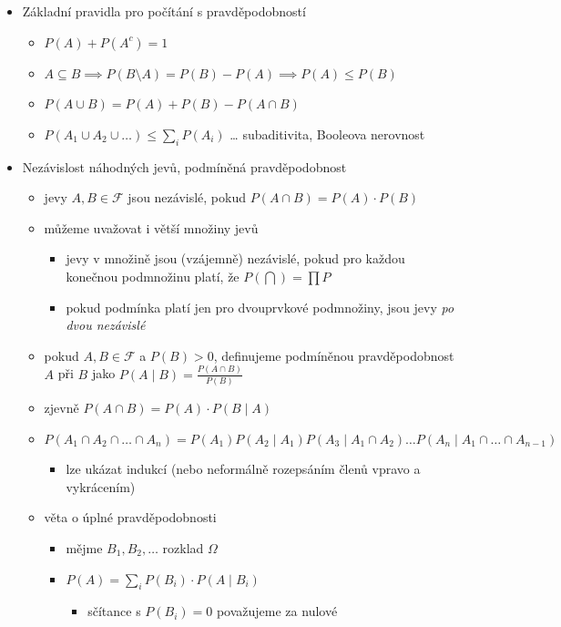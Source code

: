 \begin{itemize}
\item Základní pravidla pro počítání s pravděpodobností
\begin{itemize}
\item $P(A)+P(A^c)=1$
\item $A\subseteq B\implies P(B\setminus A)=P(B)-P(A)\implies P(A)\leq P(B)$
\item $P(A\cup B)=P(A)+P(B)-P(A\cap B)$
\item $P(A_1\cup A_2\cup\dots)\leq\sum_i P(A_i)$ \dots{} subaditivita, Booleova nerovnost
\end{itemize}
\item Nezávislost náhodných jevů, podmíněná pravděpodobnost
\begin{itemize}
\item jevy $A,B\in\mathcal F$ jsou nezávislé, pokud $P(A\cap B)=P(A)\cdot P(B)$
\item můžeme uvažovat i větší množiny jevů
\begin{itemize}
\item jevy v množině jsou (vzájemně) nezávislé, pokud pro každou konečnou podmnožinu platí, že $P(\bigcap)=\prod P$
\item pokud podmínka platí jen pro dvouprvkové podmnožiny, jsou jevy \textit{po dvou nezávislé}
\end{itemize}
\item pokud $A,B\in\mathcal F$ a $P(B)\gt 0$, definujeme podmíněnou pravděpodobnost $A$ při $B$ jako $P(A\mid B)=\frac{P(A\cap B)}{P(B)}$
\item zjevně $P(A\cap B)=P(A)\cdot P(B\mid A)$
\item $P(A_1\cap A_2\cap \dots\cap A_n)=P(A_1)P(A_2\mid A_1)P(A_3\mid A_1\cap A_2)\dots P(A_n\mid A_1\cap\dots\cap A_{n-1})$
\begin{itemize}
\item lze ukázat indukcí (nebo neformálně rozepsáním členů vpravo a vykrácením)
\end{itemize}
\item věta o úplné pravděpodobnosti
\begin{itemize}
\item mějme $B_1,B_2,\dots$ rozklad $\Omega$
\item $P(A)=\sum_iP(B_i)\cdot P(A\mid B_i)$
\begin{itemize}
\item sčítance s $P(B_i)=0$ považujeme za nulové
\end{itemize}
\end{itemize}
\end{itemize}

\end{itemize}
